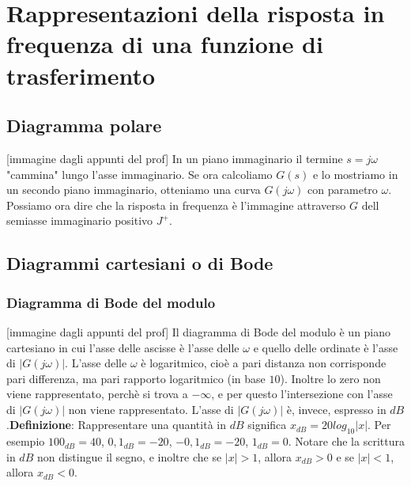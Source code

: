 \section{Rappresentazioni della risposta in frequenza di una funzione di trasferimento}
\subsection{Diagramma polare}
[immagine dagli appunti del prof]\newline
In un piano immaginario il termine $s = j \omega$ "cammina" lungo l'asse immaginario. Se ora calcoliamo $G(s)$ e lo mostriamo in un secondo piano immaginario, otteniamo una curva $
G(j \omega)$ con parametro $\omega$.\newline
\newline
Possiamo ora dire che la risposta in frequenza è l'immagine attraverso $G$ dell semiasse immaginario positivo $J^+$.
\subsection{Diagrammi cartesiani o di Bode}
\subsubsection{Diagramma di Bode del modulo}
[immagine dagli appunti del prof]\newline
\newline
Il diagramma di Bode del modulo è un piano cartesiano in cui l'asse delle ascisse è l'asse delle $\omega$ e quello delle ordinate è l'asse di $|G(j \omega)|$.\newline
\newline
L'asse delle $\omega$ è logaritmico, cioè a pari distanza non corrisponde pari differenza, ma pari rapporto logaritmico (in base $10$). Inoltre lo zero non viene rappresentato, perchè si trova a $- \infty$, e per questo l'intersezione con l'asse di $|G(j \omega)|$ non viene rappresentato.\newline
\newline
L'asse di $|G(j \omega)|$ è, invece, espresso in $dB$.\newline \textbf{Definizione}: Rappresentare una quantità in $dB$ significa $x_{dB} = 20 log_{10}|x|$.\newline
Per esempio $100_{dB} = 40$, $0,1 _{dB} = -20$, $-0,1 _{dB} = -20$, $1 _{dB} = 0$. Notare che la scrittura in $dB$ non distingue il segno, e inoltre che se $|x| > 1$, allora $x _{dB} >0$ e se $|x|<1$, allora $x _{dB} <0$.
